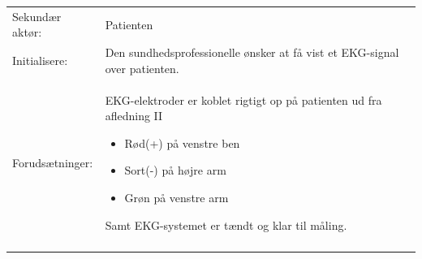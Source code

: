 \begin{table}[H]
\begin{tabularx}{\textwidth}{l X}
     Sekundær aktør:        &	Patienten                                                                                                                                                                                                                                                                                                                                                                                                                                                                                                                                                                                                                 \\ \addlinespace[1mm]  		                                                                                                                                                      
     Initialisere:          & 	Den sundhedsprofessionelle ønsker at få vist et EKG-signal over patienten.
		 \\ \addlinespace[1mm]                                                                                                                                                                                                                                                                                                             
     Forudsætninger:        & 	EKG-elektroder er koblet rigtigt op på patienten ud fra afledning II
     \begin{itemize}
     	\item Rød(+) på venstre ben
     	\item Sort(-) på højre arm
     	\item Grøn på venstre arm
     \end{itemize}
		Samt EKG-systemet er tændt og klar til måling.                                                                                                                                                                                                                                                                                                                                                                                                                                                                                                                                                                           \\ \addlinespace[1mm]                                                                                                                                                       

\end{tabularx}
\end{table}
